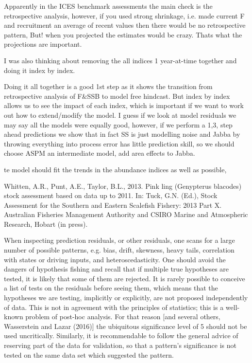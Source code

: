 Apparently in the ICES benchmark assessments the main check is the retrospective analysis, however, if you used strong shrinkage, i.e. made current F and recruitment an average of recent values then there would be no retrospective pattern, But! when you projected the estimates would be crazy. Thats what the projections are important.

I was also thinking about removing the all indices 1 year-at-time together and doing it index by index.

Doing it all together is a good 1st step as it shows the transition from retrospective analysis of F&SSB to model free hindcast. But index by index allows us to see the impact of each index, which is important if we want to work out how to extend/modify the model.
I guess if we look at  model residuals we may say all the models were equally good, however, if we perform a 1,3, step ahead predictions we show that in fact SS is just modelling noise and Jabba by throwing everything into process error has little prediction skill, so we should choose ASPM an intermediate model, add area effects to Jabba.

te model should fit the trends in the abundance indices as well as possible,

Whitten, A.R., Punt, A.E., Taylor, B.L., 2013. Pink ling (Genypterus blacodes) stock
assessment based on data up to 2011. In: Tuck, G.N. (Ed.), Stock Assessment for
the Southern and Eastern Scalefish Fishery: 2013 Part X. Australian Fisheries
Management Authority and CSIRO Marine and Atmospheric Research, Hobart
(in press).

When inspecting prediction residuals, or other residuals, one scans for a large number of possible patterns, e.g. bias, drift, skewness, heavy tails, correlation with states
or driving inputs, and heteroscedasticity. One should avoid the dangers of hypothesis
fishing and recall that if multiple true hypotheses are tested, it is likely that some of
them are rejected. It is rarely possible to conceive a list of tests on the residuals before
seeing them, which means that the hypotheses we are testing, implicitly or explicitly,
are not proposed independently of data. This is not in agreement with the principles
of statistics; this is a well-known problem of post-hoc analysis. For that reason [and
several others, Wasserstein and Lazar (2016)] the ubiquitous significance level of 5%
should not be used uncritically. Similarly, it is recommendable to follow the general
advice of reserving part of the data for validation, so that a pattern’s significance is
not tested on the same data set which suggested the pattern.

